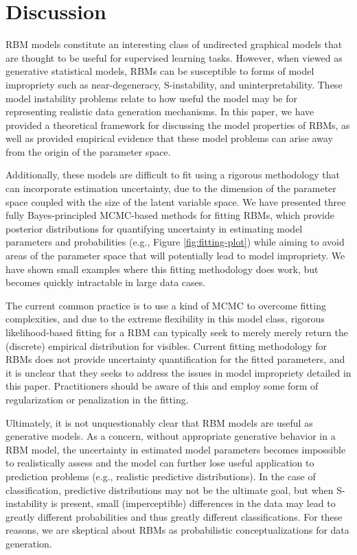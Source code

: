 \documentclass[]{article}
\theoremstyle{definition}
\begin{document}
\hypertarget{discussion}{%
\section{Discussion}\label{discussion}}

RBM models constitute an interesting class of undirected graphical
models that are thought to be useful for supervised learning tasks.
However, when viewed as generative statistical models, RBMs can be
susceptible to forms of model impropriety such as near-degeneracy,
S-instability, and uninterpretability. These model instability problems
relate to how useful the model may be for representing realistic data
generation mechanisms. In this paper, we have provided a theoretical
framework for discussing the model properties of RBMs, as well as
provided empirical evidence that these model problems can arise away
from the origin of the parameter space.

Additionally, these models are difficult to fit using a rigorous
methodology that can incorporate estimation uncertainty, due to the
dimension of the parameter space coupled with the size of the latent
variable space. We have presented three fully Bayes-principled
MCMC-based methods for fitting RBMs, which provide posterior
distributions for quantifying uncertainty in estimating model parameters
and probabilities (e.g., Figure \ref{fig:fitting-plot}) while aiming to
avoid areas of the parameter space that will potentially lead to model
impropriety. We have shown small examples where this fitting methodology
does work, but becomes quickly intractable in large data cases.

The current common practice is to use a kind of MCMC to overcome fitting
complexities, and due to the extreme flexibility in this model class,
rigorous likelihood-based fitting for a RBM can typically seek to merely
merely return the (discrete) empirical distribution for visibles.
Current fitting methodology for RBMs does not provide uncertainty
quantification for the fitted parameters, and it is unclear that they
seeks to address the issues in model impropriety detailed in this paper.
Practitioners should be aware of this and employ some form of
regularization or penalization in the fitting.

Ultimately, it is not unquestionably clear that RBM models are useful as
generative models. As a concern, without appropriate generative behavior
in a RBM model, the uncertainty in estimated model parameters becomes
impossible to realistically assess and the model can further lose useful
application to prediction problems (e.g., realistic predictive
distributions). In the case of classification, predictive distributions
may not be the ultimate goal, but when S-instability is present, small
(imperceptible) differences in the data may lead to greatly different
probabilities and thus greatly different classifications. For these
reasons, we are skeptical about RBMs as probabilistic conceptualizations
for data generation.
\end{document}
